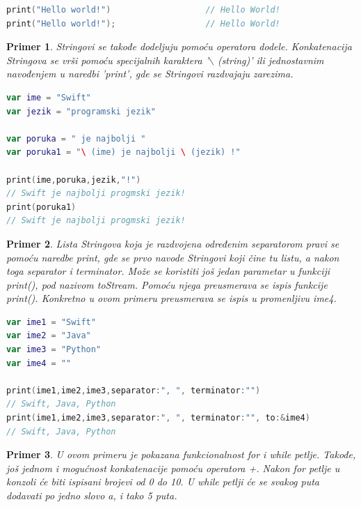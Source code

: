 \documentclass[a4paper]{article}
\newtheorem{primer}{Primer}[section]
\begin{document}
\begin{lstlisting}[language=Swift, caption={Ispis teksta},frame=single, label=simple]
print("Hello world!")				    // Hello World!
print("Hello world!");					// Hello World!
\end{lstlisting}

\begin{primer}
Stringovi se takođe dodeljuju pomoću operatora dodele. Konkatenacija Stringova se vrši pomoću specijalnih karaktera '$\backslash$ (string)' ili jednostavnim navođenjem u naredbi 'print', gde se Stringovi razdvajaju zarezima.
\end{primer}

\begin{lstlisting}[language=Swift, caption={Stringovi i konkatenacija stringova},frame=single, label=simple]
var ime = "Swift"
var jezik = "programski jezik"

var poruka = " je najbolji "
var poruka1 = "\ (ime) je najbolji \ (jezik) !" 

print(ime,poruka,jezik,"!")
// Swift je najbolji progmski jezik!
print(poruka1) 
// Swift je najbolji progmski jezik!
\end{lstlisting}

\begin{primer}
Lista Stringova koja je razdvojena određenim separatorom pravi se pomoću naredbe print, gde se prvo navode Stringovi koji čine tu listu, a nakon toga separator i terminator. Može se koristiti još jedan parametar u funkciji print(), pod nazivom toStream. Pomoću njega preusmerava se ispis funkcije print(). Konkretno u ovom primeru preusmerava se ispis u promenljivu ime4.
\end{primer}

\begin{lstlisting}[language=Swift, caption={Lista stringova},frame=single, label=simple]
var ime1 = "Swift"
var ime2 = "Java"
var ime3 = "Python"
var ime4 = ""

print(ime1,ime2,ime3,separator:", ", terminator:"") 
// Swift, Java, Python
print(ime1,ime2,ime3,separator:", ", terminator:"", to:&ime4)
// Swift, Java, Python
\end{lstlisting}

\begin{primer}
U ovom primeru je pokazana funkcionalnost for i while petlje. Takođe, još jednom i mogućnost konkatenacije pomoću operatora +. Nakon for petlje u konzoli će biti ispisani brojevi od 0 do 10. U while petlji će se svakog puta dodavati po jedno slovo a, i tako 5 puta.
\end{primer}
\end{document}
